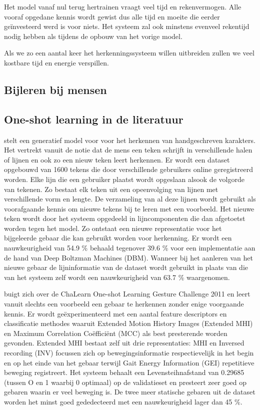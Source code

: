 \npar Het model vanaf nul terug hertrainen vraagt veel tijd en rekenvermogen. Alle vooraf opgedane kennis wordt gewist dus alle tijd en moeite die eerder ge\"investeerd werd is voor niets. Het systeem zal ook minstens evenveel rekentijd nodig hebben als tijdens de opbouw van het vorige model.

\npar Als we zo een aantal keer het herkenningssysteem willen uitbreiden zullen we veel kostbare tijd en energie verspillen.

\subsection{Bijleren bij mensen}





\subsection{One-shot learning in de literatuur}


\npar \cite{oneshot-vis-concepts} stelt een generatief model voor voor het herkennen van handgeschreven karakters. Het vertrekt vanuit de notie dat de mens een teken schrijft in verschillende halen of lijnen en ook zo een nieuw teken leert herkennen. Er wordt een dataset opgebouwd van 1600 tekens die door verschillende gebruikers online geregistreerd worden. Elke lijn die een gebruiker plaatst wordt opgeslaan alsook de volgorde van tekenen. Zo bestaat elk teken uit een opeenvolging van lijnen met verschillende vorm en lengte. De verzameling van al deze lijnen wordt gebruikt als voorafgaande kennis om nieuwe tekens bij te leren met een voorbeeld. Het nieuwe teken wordt door het systeem opgedeeld in lijncomponenten die dan afgetoetst worden tegen het model. Zo ontstaat een nieuwe representatie voor het bijgeleerde gebaar die kan gebruikt worden voor herkenning. Er wordt een nauwkeurigheid van 54.9 \% behaald tegenover 39.6 \% voor een implementatie aan de hand van Deep Boltzman Machines (DBM). Wanneer bij het aanleren van het nieuwe gebaar de lijninformatie van de dataset wordt gebruikt in plaats van die van het systeem zelf wordt een nauwkeurigheid van 63.7 \% waargenomen.

\npar \cite{oneshot-gesture-rgbd} buigt zich over de ChaLearn One-shot Learning Gesture Challenge 2011 en leert vanuit slechts een voorbeeld een gebaar te herkennen zonder enige voorgaande kennis. Er wordt ge\"experimenteerd met een aantal feature descriptors en classificatie methodes waaruit Extended Motion History Images (Extended MHI) en Maximum Correlation Co\"effici\"ent (MCC) als best presterende worden gevonden. Extended MHI  bestaat zelf uit drie representaties: MHI en Inversed recording (INV) focussen zich op bewegingsinformatie respectievelijk in het begin en op het einde van het gebaar terwijl Gait Energy Information (GEI) repetitieve beweging registreert. Het systeem behaalt een Levensteihnafstand van 0.29685 (tussen O en 1 waarbij 0 optimaal) op de validatieset en presteert zeer goed op gebaren waarin er veel beweging is. De twee meer statische gebaren uit de dataset worden het minst goed gededecteerd met een nauwkeurigheid lager dan 45 \%.

